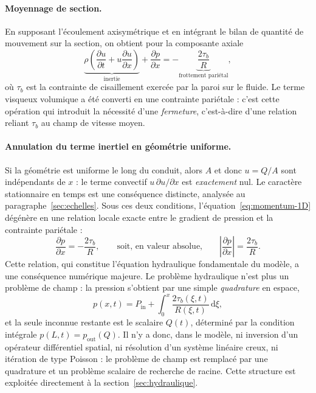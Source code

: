 \documentclass[11pt,a4paper]{report}
\begin{document}
\paragraph{Moyennage de section.} En supposant l'écoulement axisymétrique et en intégrant le bilan de
quantité de mouvement sur la section, on obtient pour la composante axiale
\begin{equation}
\underbrace{\rho\left(\frac{\partial u}{\partial t} + u\frac{\partial u}{\partial x}\right)}_{\text{inertie}}
+ \frac{\partial p}{\partial x}
= -\underbrace{\frac{2\tau_b}{R}}_{\text{frottement pariétal}},
\label{eq:momentum-1D}
\end{equation}
où \(\tau_b\) est la contrainte de cisaillement exercée par la paroi sur le fluide. Le terme visqueux
volumique a été converti en une contrainte pariétale : c'est cette opération qui introduit la nécessité
d'une \emph{fermeture}, c'est-à-dire d'une relation reliant \(\tau_b\) au champ de vitesse moyen.

\paragraph{Annulation du terme inertiel en géométrie uniforme.} Si la géométrie est uniforme le long du
conduit, alors \(A\) et donc \(u = Q/A\) sont indépendants de \(x\) : le terme convectif
\(u\,\partial u/\partial x\) est \emph{exactement} nul. Le caractère stationnaire en temps est une
conséquence distincte, analysée au paragraphe~\ref{sec:echelles}. Sous ces deux conditions,
l'équation~\eqref{eq:momentum-1D} dégénère en une relation locale exacte entre le gradient de pression
et la contrainte pariétale :
\begin{equation}
\frac{\partial p}{\partial x} = -\frac{2\tau_b}{R},
\qquad\text{soit, en valeur absolue,}\qquad
\left|\frac{\partial p}{\partial x}\right| = \frac{2\tau_b}{R}.
\label{eq:quasi-statique}
\end{equation}
Cette relation, qui constitue l'équation hydraulique fondamentale du modèle, a une conséquence numérique
majeure. Le problème hydraulique n'est plus un problème de champ : la pression s'obtient par une simple
\emph{quadrature} en espace,
\begin{equation}
p(x,t) = P_{\mathrm{in}} + \int_0^x \frac{2\tau_b(\xi,t)}{R(\xi,t)}\,\mathrm{d}\xi ,
\label{eq:quadrature-p}
\end{equation}
et la seule inconnue restante est le scalaire \(Q(t)\), déterminé par la condition intégrale
\(p(L,t) = p_{\mathrm{out}}(Q)\). Il n'y a donc, dans le modèle, ni inversion d'un opérateur
différentiel spatial, ni résolution d'un système linéaire creux, ni itération de type Poisson : le
problème de champ est remplacé par une quadrature et un problème scalaire de recherche de racine. Cette
structure est exploitée directement à la section~\ref{sec:hydraulique}.
\end{document}

